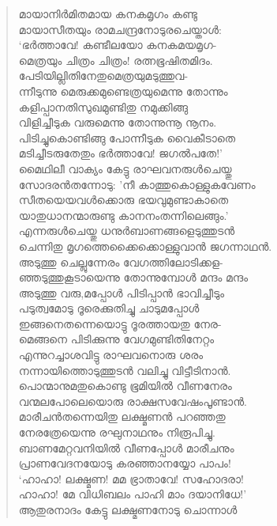 \begin{verse}
മായാനിര്‍മിതമായ കനകമൃഗം കണ്ടു\\
മായാസീതയും രാമചന്ദ്രനോടുരചെയ്താള്‍:\\
‘ഭര്‍ത്താവേ! കണ്ടീലയോ കനകമയമൃഗ-\\
മെത്രയും ചിത്രം ചിത്രം! രത്നഭൂഷിതമിദം.\\
പേടിയില്ലിതിനേതുമെത്രയുമടുത്തുവ-\\
ന്നീടുന്നു മെരുക്കമുണ്ടെത്രയുമെന്നു തോന്നും\\
കളിപ്പാനതിസുഖമുണ്ടിതു നമുക്കിങ്ങു\\
വിളിച്ചീടുക വരുമെന്നു തോന്നുന്നൂ നൂനം.\\
പിടിച്ചുകൊണ്ടിങ്ങു പോന്നീടുക വൈകീടാതെ\\
മടിച്ചീടരുതേതും ഭര്‍ത്താവേ! ജഗല്‍പതേ!’\\
മൈഥിലീ വാക്യം കേട്ടു രാഘവനരുള്‍ചെയ്തു\\
സോദരന്‍തന്നോടു: ’നീ കാത്തുകൊള്ളുകവേണം\\
സീതയെയവള്‍ക്കൊരു ഭയവുമുണ്ടാകാതെ\\
യാതുധാനന്മാരുണ്ടു കാനനംതന്നിലെങ്ങും.’\\
എന്നരുള്‍ചെയ്തു ധനുര്‍ബാണങ്ങളെടുത്തുടന്‍\\
ചെന്നിതു മൃഗത്തെക്കൈക്കൊള്ളുവാന്‍ ജഗന്നാഥന്‍.\\
അടുത്തു ചെല്ലുന്നേരം വേഗത്തിലോടിക്കള-\\
ഞ്ഞടുത്തുകൂടായെന്നു തോന്നുമ്പോള്‍ മന്ദം മന്ദം\\
അടുത്തു വരു,മപ്പോള്‍ പിടിപ്പാന്‍ ഭാവിച്ചീടും\\
പടുത്വമോടു ദൂരെക്കുതിച്ചു ചാടുമപ്പോള്‍\\
ഇങ്ങനെതന്നെയൊട്ടു ദൂരത്തായതു നേര-\\
മെങ്ങനെ പിടിക്കുന്നു വേഗമുണ്ടിതിനേറ്റം\\
എന്നുറച്ചാശവിട്ടു രാഘവനൊരു ശരം\\
നന്നായിത്തൊടുത്തുടന്‍ വലിച്ചു വിട്ടീടിനാന്‍.\\
പൊന്മാനുമതുകൊണ്ടു ഭൂമിയില്‍ വീണനേരം\\
വന്മലപോലെയൊരു രാക്ഷസവേഷംപൂണ്ടാന്‍.\\
മാരീചന്‍തന്നെയിതു ലക്ഷ്മണന്‍ പറഞ്ഞതു\\
നേരത്രേയെന്നു രഘുനാഥനും നിരൂപിച്ചു.\\
ബാണമേറ്റവനിയില്‍ വീണപ്പോള്‍ മാരീചനും\\
പ്രാണവേദനയോടു കരഞ്ഞാനയ്യോ പാപം!\\
‘ഹാഹാ! ലക്ഷ്മണ! മമ ഭ്രാതാവേ! സഹോദരാ!\\
ഹാഹാ! മേ വിധിബലം പാഹി മാം ദയാനിധേ!’\\
ആതുരനാദം കേട്ടു ലക്ഷ്മണനോടു ചൊന്നാള്‍\\

\end{verse}
